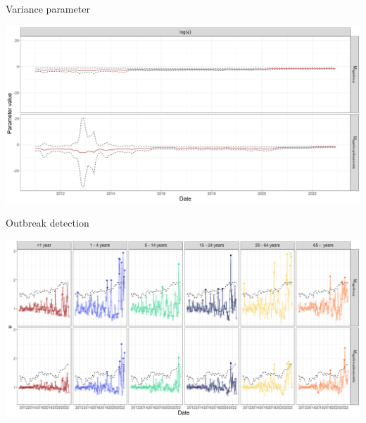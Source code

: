 \documentclass[aspectratio=169]{beamer}
\begin{document}
\begin{frame}{Variance parameter}
\protect\hypertarget{variance-parameter-1}{}
\tiny

\includegraphics[width=1\linewidth]{../figures/log_phixSTEC_PoisG}

\normalsize
\end{frame}

\begin{frame}{Outbreak detection}
\protect\hypertarget{outbreak-detection-1}{}
\tiny

\includegraphics[width=1\linewidth]{../figures/OutbreakDetectionxSTEC_PoisG}

\normalsize
\end{frame}
\end{document}
